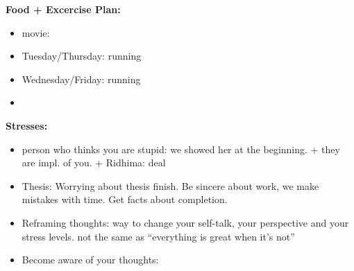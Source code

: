 \documentclass[11pt]{article}
\begin{document}
{  \textbf{Food + Excercise Plan:}\\
  \begin{itemize} 
  \item \tiny movie: 
    \tiny \item \tiny Tuesday/Thursday: running 
  \item \tiny Wednesday/Friday: running 
  \item \tiny 
  \end{itemize}
            \textbf{Stresses:}\\
            \begin{itemize} 
            \item \tiny person who thinks you are stupid:  we
              showed her at the beginning.  + they are impl. of you. +
               Ridhima: deal 
            \item \tiny Thesis:  Worrying about thesis finish. Be
              sincere about work, we make mistakes with time. Get
              facts about completion.

              \item Reframing thoughts: way to change your self-talk,
                your perspective and your stress levels. not the same
                as ``everything is great when it's not'' 
                
              \item Become aware of your thoughts: 
                
            \end{itemize}
            
}
\end{document}
